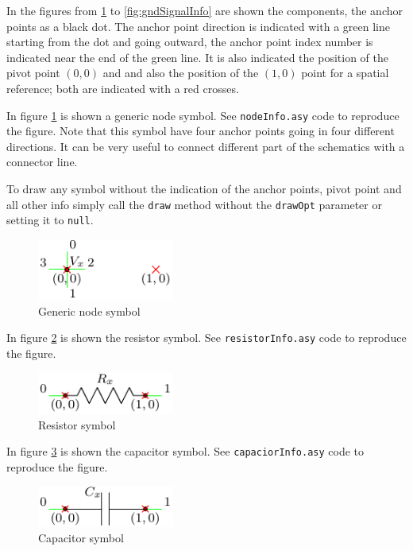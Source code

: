 \documentclass[a4paper,12pt]{report}
\begin{document}
In the figures from \ref{fig:nodeInfo} to \ref{fig:gndSignalInfo} are shown the components, the anchor points as a black dot. The anchor point direction is indicated with a green line starting from the dot and going outward, the anchor point index number is indicated near the end of the green line. It is also indicated the position of the pivot point $(0,0)$ and and also the position of the $(1,0)$ point for a spatial reference; both are indicated with a red crosses.

In figure \ref{fig:nodeInfo} is shown a generic node symbol. See \texttt{nodeInfo.asy} code to reproduce the figure. Note that this symbol have four anchor points going in four different directions. It can be very useful to connect different part of the schematics with a connector line.

To draw any symbol without the indication of the anchor points, pivot point and all other info simply call the \texttt{draw} method without the \texttt{drawOpt} parameter or setting it to \texttt{null}.   

\begin{figure}[ht]
\centering
\includegraphics[width=0.4\textwidth]{nodeInfo}
\caption{Generic node symbol}
\label{fig:nodeInfo}
\end{figure}

In figure \ref{fig:resistorInfo} is shown the resistor symbol. See \texttt{resistorInfo.asy} code to reproduce the figure.

\begin{figure}[ht]
\centering
\includegraphics[width=0.4\textwidth]{resistorInfo}
\caption{Resistor symbol}
\label{fig:resistorInfo}
\end{figure}

In figure \ref{fig:capaciorInfo} is shown the capacitor symbol. See \texttt{capaciorInfo.asy} code to reproduce the figure.

\begin{figure}[ht]
\centering
\includegraphics[width=0.4\textwidth]{capacitorInfo}
\caption{Capacitor symbol}
\label{fig:capaciorInfo}
\end{figure}
\end{document}
